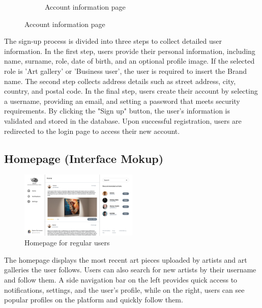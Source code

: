 \begin{figure}[H]
\begin{subfigure}[b]{0.49\textwidth}
    \caption{Account information page}
\end{subfigure}
\end{figure}

The sign-up process is divided into three steps to collect detailed user information. In the first step, users provide their personal information, including name, surname, role, date of birth, and an optional profile image. If the selected role is 'Art gallery' or 'Business user', the user is required to insert the Brand name. 
The second step collects address details such as street address, city, country, and postal code. 
In the final step, users create their account by selecting a username, providing an email, and setting a password that meets security requirements.
By clicking the "Sign up" button, the user's information is validated and stored in the database.
Upon successful registration, users are redirected to the login page to access their new account.


    
\subsection{Homepage (Interface Mokup)}
\begin{figure}[H]
    \centering
    \includegraphics[width=0.5\textwidth]{images/interface_mockups/Home - regular users.pdf}
    \caption{Homepage for regular users}
\end{figure}

The homepage displays the most recent art pieces uploaded by artists and art galleries the user follows. 
Users can also search for new artists by their username and follow them. 
A side navigation bar on the left provides quick access to notifications, settings, and the user’s profile, while on the right, users can see popular profiles on the platform and quickly follow them.

